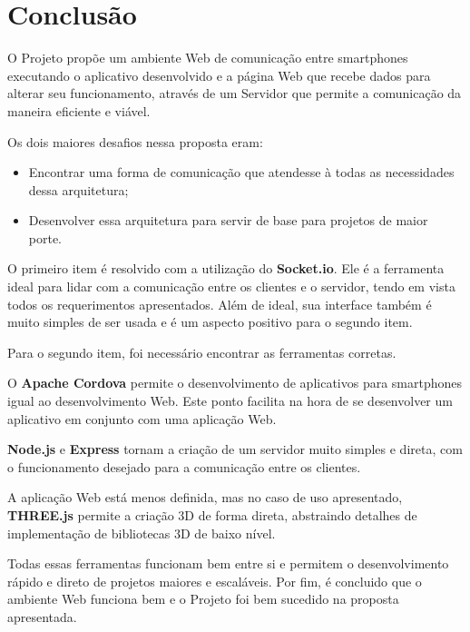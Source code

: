 \documentclass[a4paper,12pt]{article}
\begin{document}
\newpage
\section{Conclusão}

O Projeto propõe um ambiente Web de comunicação entre smartphones executando o aplicativo desenvolvido e a página Web que recebe dados para alterar seu funcionamento, através de um Servidor que permite a comunicação da maneira eficiente e viável.

Os dois maiores desafios nessa proposta eram:

\begin{itemize}
    \item Encontrar uma forma de comunicação que atendesse à todas as necessidades dessa arquitetura;
    \item Desenvolver essa arquitetura para servir de base para projetos de maior porte.
\end{itemize}

O primeiro item é resolvido com a utilização do \textbf{Socket.io}. Ele é a ferramenta ideal para lidar com a comunicação entre os clientes e o servidor, tendo em vista todos os requerimentos apresentados. Além de ideal, sua interface também é muito simples de ser usada e é um aspecto positivo para o segundo item.

Para o segundo item, foi necessário encontrar as ferramentas corretas.

O \textbf{Apache Cordova} permite o desenvolvimento de aplicativos para smartphones igual ao desenvolvimento Web. Este ponto facilita na hora de se desenvolver um aplicativo em conjunto com uma aplicação Web.

\textbf{Node.js} e \textbf{Express} tornam a criação de um servidor muito simples e direta, com o funcionamento desejado para a comunicação entre os clientes.

A aplicação Web está menos definida, mas no caso de uso apresentado, \textbf{THREE.js} permite a criação 3D de forma direta, abstraindo detalhes de implementação de bibliotecas 3D de baixo nível.

Todas essas ferramentas funcionam bem entre si e permitem o desenvolvimento rápido e direto de projetos maiores e escaláveis. Por fim, é concluido que o ambiente Web funciona bem e o Projeto foi bem sucedido na proposta apresentada.


\newpage
\end{document}
